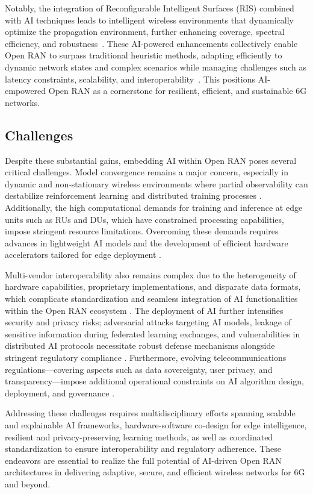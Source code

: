 \documentclass[sigconf]{acmart}
\begin{document}
Notably, the integration of Reconfigurable Intelligent Surfaces (RIS) combined with AI techniques leads to intelligent wireless environments that dynamically optimize the propagation environment, further enhancing coverage, spectral efficiency, and robustness~\cite{ref49}. These AI-powered enhancements collectively enable Open RAN to surpass traditional heuristic methods, adapting efficiently to dynamic network states and complex scenarios while managing challenges such as latency constraints, scalability, and interoperability~\cite{ref54}. This positions AI-empowered Open RAN as a cornerstone for resilient, efficient, and sustainable 6G networks.

\subsection{Challenges}

Despite these substantial gains, embedding AI within Open RAN poses several critical challenges. Model convergence remains a major concern, especially in dynamic and non-stationary wireless environments where partial observability can destabilize reinforcement learning and distributed training processes \cite{ref54}. Additionally, the high computational demands for training and inference at edge units such as RUs and DUs, which have constrained processing capabilities, impose stringent resource limitations. Overcoming these demands requires advances in lightweight AI models and the development of efficient hardware accelerators tailored for edge deployment \cite{ref48}.

Multi-vendor interoperability also remains complex due to the heterogeneity of hardware capabilities, proprietary implementations, and disparate data formats, which complicate standardization and seamless integration of AI functionalities within the Open RAN ecosystem \cite{ref49}. The deployment of AI further intensifies security and privacy risks; adversarial attacks targeting AI models, leakage of sensitive information during federated learning exchanges, and vulnerabilities in distributed AI protocols necessitate robust defense mechanisms alongside stringent regulatory compliance \cite{ref50}. Furthermore, evolving telecommunications regulations—covering aspects such as data sovereignty, user privacy, and transparency—impose additional operational constraints on AI algorithm design, deployment, and governance \cite{ref48}.

Addressing these challenges requires multidisciplinary efforts spanning scalable and explainable AI frameworks, hardware-software co-design for edge intelligence, resilient and privacy-preserving learning methods, as well as coordinated standardization to ensure interoperability and regulatory adherence. These endeavors are essential to realize the full potential of AI-driven Open RAN architectures in delivering adaptive, secure, and efficient wireless networks for 6G and beyond.
\end{document}
